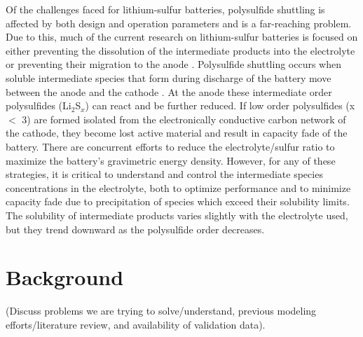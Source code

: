 \documentclass{elsarticle}
\begin{document}
Of the challenges faced for lithium-sulfur batteries, polysulfide shuttling is affected by both design and operation parameters and is a far-reaching problem. Due to this, much of the current research on lithium-sulfur batteries is focused on either preventing the dissolution of the intermediate products into the electrolyte or preventing their migration to the anode \cite{CHEN20201605, liu2016, cheng2019, pang2015}. Polysulfide shuttling occurs when soluble intermediate species that form during discharge of the battery move between the anode and the cathode \cite{C5EE01388G}. At the anode these intermediate order polysulfides (Li$_2$S$_x$) can react and be further reduced. If low order polysulfides (x $<$ 3) are formed isolated from the electronically conductive carbon network of the cathode, they become lost active material and result in capacity fade of the battery. There are concurrent efforts to reduce the electrolyte/sulfur ratio to maximize the battery’s gravimetric energy density. However, for any of these strategies, it is critical to understand and control the intermediate species concentrations in the electrolyte, both to optimize performance and to minimize capacity fade due to precipitation of species which exceed their solubility limits. The solubility of intermediate products varies slightly with the electrolyte used, but they trend downward as the polysulfide order decreases.


\section{Background}

(Discuss problems we are trying to solve/understand, previous modeling efforts/literature review, and availability of validation data).
\end{document}
